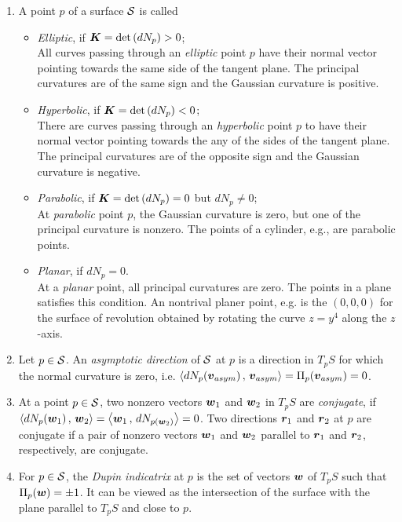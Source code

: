 \documentclass[11pt]{article}
\begin{document}
\begin{enumerate}
\item  \begin{definition}
A point $p$ of a surface ${\mathcal S}$ is called
\begin{itemize}
\item \emph{Elliptic}, if $\boldsymbol{K}= \det\left(dN_{p}\right) >0$; \\
All curves passing through an \emph{elliptic} point $p$ have their normal vector pointing towards the same side of the tangent plane. The principal curvatures are of the same sign and the Gaussian curvature is positive. 

\item \emph{Hyperbolic}, if $\boldsymbol{K}=\det\left(dN_{p}\right) <0$;\\
There are curves passing through an \emph{hyperbolic} point $p$ to have their normal vector pointing towards the any of the sides of the tangent plane. The principal curvatures are of the opposite sign and the Gaussian curvature is negative. 


\item \emph{Parabolic}, if  $\boldsymbol{K}=\det\left(dN_{p}\right) =0$ but $dN_{p}\neq 0$;\\
At \emph{parabolic} point $p$, the Gaussian curvature is zero, but one of the principal curvature is nonzero. The points of a cylinder, e.g., are parabolic points. 

\item \emph{Planar}, if $dN_{p} = 0$.\\
At a \emph{planar} point, all principal curvatures are zero. The points in a plane satisfies this condition. An nontrival planer point, e.g. is the $(0,0,0)$ for the surface of revolution obtained by rotating the curve $z= y^{4}$ along the $z$-axis.   
\end{itemize}
\end{definition} 

\item  \begin{definition}
Let $p\in {\mathcal S}$. An \emph{asymptotic direction} of ${\mathcal S}$ at $p$ is a direction in $T_{p}S$ for which the normal curvature is zero, i.e. $\left\langle dN_{p}(\boldsymbol{v}_{asym})\,,\, \boldsymbol{v}_{asym} \right\rangle = \Pi_{p}(\boldsymbol{v}_{asym})=0$. 
\end{definition} 

\item   \begin{definition}
At a point $p\in {\mathcal S}$, two nonzero vectors $\boldsymbol{w}_{1}$ and $\boldsymbol{w}_{2}$ in $T_{p}S$ are \emph{conjugate}, if $\left\langle dN_{p}(\boldsymbol{w}_{1})\,,\, \boldsymbol{w}_{2} \right\rangle = \left\langle \boldsymbol{w}_{1}\,,\, dN_{p(\boldsymbol{w}_{2})} \right\rangle = 0$. Two directions $\boldsymbol{r}_{1}$ and $\boldsymbol{r}_{2}$ at $p$ are conjugate if a pair of nonzero vectors  $\boldsymbol{w}_{1}$ and $\boldsymbol{w}_{2}$ parallel to $\boldsymbol{r}_{1}$ and $\boldsymbol{r}_{2}$, respectively, are conjugate. 
\end{definition} 

\item For $p\in {\mathcal S}$, the \emph{Dupin indicatrix} at $p$ is the set of vectors $\boldsymbol{w}$ of $T_{p}S$ such that $\Pi_{p}(\boldsymbol{w}) = \pm 1$. It can be viewed as the intersection of the surface with the plane parallel to $T_{p}S$ and close to $p$.
\end{enumerate}
\end{document}
